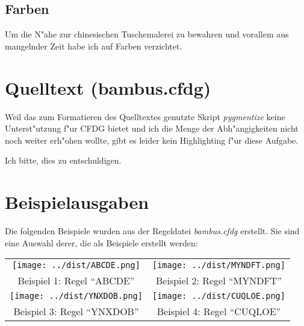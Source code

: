 \documentclass{scrreprt}
\begin{document}
\section{Farben}

Um die N"ahe zur chinesischen Tuschemalerei zu bewahren und vorallem aus
mangelnder Zeit habe ich auf Farben verzichtet.

\chapter{Quelltext (bambus.cfdg)}

Weil das zum Formatieren des Quelltextes genutzte Skript \emph{pygmentize} keine
Unterst"utzung f"ur CFDG bietet und ich die Menge der Abh"angigkeiten nicht noch
weiter erh"ohen wollte, gibt es leider kein Highlighting f"ur diese Aufgabe.

Ich bitte, dies zu entschuldigen.


\chapter{Beispielausgaben}

Die folgenden Beispiele wurden aus der Regeldatei \emph{bambus.cfdg} erstellt.
Sie sind eine Auswahl derer, die als Beispiele erstellt werden:

\begin{tabular}{cc}
\texttt{[image: ../dist/ABCDE.png]}  &
\texttt{[image: ../dist/MYNDFT.png]} \\
Beispiel 1: Regel "`ABCDE"' &
Beispiel 2: Regel "`MYNDFT"' \\
\texttt{[image: ../dist/YNXDOB.png]} &
\texttt{[image: ../dist/CUQLOE.png]} \\
Beispiel 3: Regel "`YNXDOB"' &
Beispiel 4: Regel "`CUQLOE"'
\end{tabular}
\end{document}
